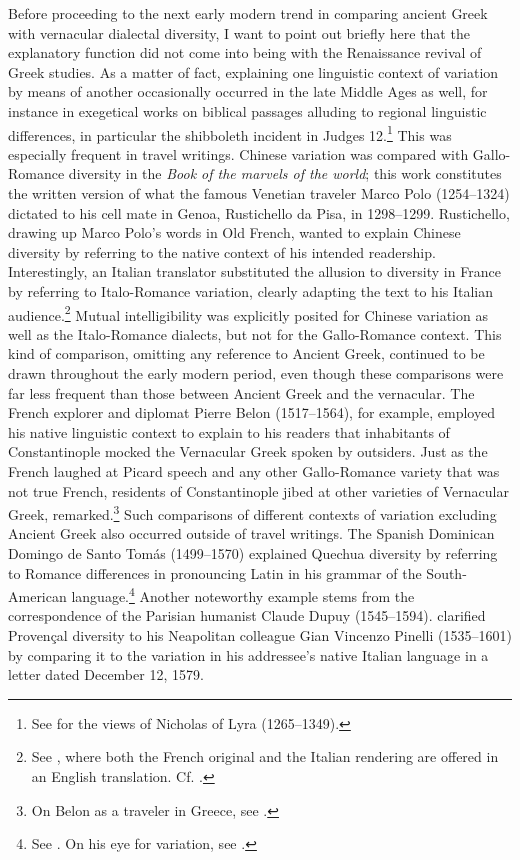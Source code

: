 Before proceeding to the next early modern trend in comparing ancient Greek with vernacular dialectal diversity, I want to point out briefly here that the explanatory function did not come into being with the Renaissance revival of Greek studies. As a matter of fact, explaining one linguistic context of variation by means of another occasionally occurred in the late Middle Ages as well, for instance in exegetical works on biblical passages alluding to regional linguistic differences, in particular the shibboleth incident in Judges 12.\footnote{See \citet[199--200]{VanRooy2018b} for the views of Nicholas of Lyra (1265–1349).} This was especially frequent in travel writings. Chinese variation was compared with Gallo-Romance diversity in the \textit{Book of the marvels of the world}; this work constitutes the written version of what the famous Venetian traveler Marco Polo (1254–1324) dictated to his cell mate in Genoa, Rustichello da Pisa, in 1298–1299. Rustichello, drawing up Marco Polo’s words in Old French, wanted to explain Chinese diversity by referring to the native context of his intended readership. Interestingly, an Italian translator substituted the allusion to diversity in France by referring to Italo-Romance variation, clearly adapting the text to his Italian audience.\footnote{See \citet[157]{Polo1938}, where both the French original and the Italian rendering are offered in an English translation. Cf. \citet[855]{Borst1959}.} Mutual intelligibility was explicitly posited for Chinese variation as well as the Italo-Romance dialects, but not for the Gallo-Romance context. This kind of comparison, omitting any reference to Ancient Greek, continued to be drawn throughout the early modern period, even though these comparisons were far less frequent than those between Ancient Greek and the vernacular. The French explorer and diplomat Pierre Belon (1517–1564), for example, employed his native linguistic context to explain to his readers that inhabitants of Constantinople mocked the Vernacular Greek spoken by outsiders. Just as the French laughed at Picard speech and any other Gallo-Romance variety that was not true French, residents of Constantinople jibed at other varieties of Vernacular Greek, \citet[5\textsc{\textsuperscript{v}}]{Belon1553} remarked.\footnote{On Belon as a traveler in Greece, see \citet[esp. 122]{Vingopoulou2004}.} Such comparisons of different contexts of variation excluding Ancient Greek also occurred outside of travel writings. The Spanish Dominican Domingo de Santo Tomás (1499–1570) explained Quechua diversity by referring to Romance differences in pronouncing Latin in his grammar of the South-American language.\footnote{See \citet[1\textsc{\textsuperscript{v}}]{Santo1560}. On his eye for variation, see \citet[140]{Calvo2005}.} Another noteworthy example stems from the correspondence of the Parisian humanist Claude Dupuy (1545–1594). \citet[274]{Dupuy2001} clarified Provençal diversity to his Neapolitan colleague Gian Vincenzo Pinelli (1535–1601) by comparing it to the variation in his addressee’s native Italian language in a letter dated December 12, 1579.

